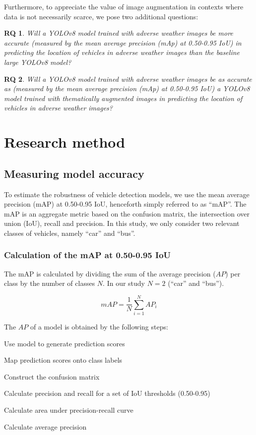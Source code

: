 \documentclass[]{article}
\newtheorem{researchquestion}{RQ}
\begin{document}
	Furthermore, to appreciate the value of image augmentation in contexts where data is not necessarily scarce, we pose two additional questions:
	\begin{researchquestion}
		\label{rq2}
		Will a YOLO{\small v8} model trained with adverse weather images be more accurate (measured by the mean average precision (mAp) at 0.50-0.95 IoU) in predicting the location of vehicles in adverse weather images than the baseline large YOLO{\small v8} model?
	\end{researchquestion}

	\begin{researchquestion}
		\label{rq3}
		Will a YOLO{\small v8} model trained with adverse weather images be as accurate as (measured by the mean average precision (mAp) at 0.50-0.95 IoU) a YOLO{\small v8} model trained with thematically augmented images in predicting the location of vehicles in adverse weather images?
	\end{researchquestion}

\section{Research method}
\subsection{Measuring model accuracy}

	To estimate the robustness of vehicle detection models, we use the mean average precision (mAP) at 0.50-0.95 IoU, henceforth simply referred to as ``mAP''. The mAP is an aggregate metric based on the confusion matrix, the intersection over union (IoU), recall and precision. In this study, we only consider two relevant classes of vehicles, namely ``car'' and ``bus''.

\subsubsection{Calculation of the mAP at 0.50-0.95 IoU}

	The mAP is calculated by dividing the sum of the average precision ($AP$) per class by the number of classes $N$.  In our study $N = 2$ (``car'' and ``bus'').
	
	\[
	mAP = \frac{1}{N} \sum_{i=1}^{N} AP_i
	\]

	The $AP$ of a model is obtained by the following steps:

	\begin{center}
		\begin{compactenum}
			\item Use model to generate prediction scores
			\item Map prediction scores onto class labels
			\item Construct the confusion matrix
			\item Calculate precision and recall for a set of IoU thresholds (0.50-0.95)
			\item Calculate area under precision-recall curve
			\item Calculate average precision
		\end{compactenum}
	\end{center}
\end{document}
